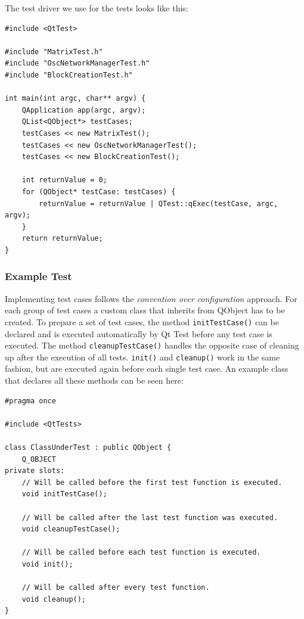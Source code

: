 \documentclass{scrreprt}
\begin{document}
The test driver we use for the tests looks like this:

\bigskip
\begin{lstlisting}[title=tests-qt/main.cpp]
#include <QtTest>

#include "MatrixTest.h"
#include "OscNetworkManagerTest.h"
#include "BlockCreationTest.h"

int main(int argc, char** argv) {
	QApplication app(argc, argv);	
	QList<QObject*> testCases;
	testCases << new MatrixTest();
	testCases << new OscNetworkManagerTest();
	testCases << new BlockCreationTest();
	
	int returnValue = 0;
	for (QObject* testCase: testCases) {
		returnValue = returnValue | QTest::qExec(testCase, argc, argv);
	}
	return returnValue;
}
\end{lstlisting}
\bigskip

\subsubsection{Example Test}

Implementing test cases follows the \textit{convention over configuration} approach. For each group of test cases a custom class that inherits from QObject has to be created. To prepare a set of test cases, the method \texttt{initTestCase()} can be declared and is executed automatically by Qt Test before any test case is executed. The method \texttt{cleanupTestCase()} handles the opposite case of cleaning up after the execution of all tests. \texttt{init()} and \texttt{cleanup()} work in the same fashion, but are executed again before each single test case. An example class that declares all these methods can be seen here:

\bigskip
\begin{lstlisting}[title=tests-qt/ClassUnderTest.h]
#pragma once

#include <QtTests>

class ClassUnderTest : public QObject {
	Q_OBJECT
private slots:
	// Will be called before the first test function is executed.
	void initTestCase();
	
	// Will be called after the last test function was executed.
	void cleanupTestCase();
	
	// Will be called before each test function is executed.
	void init();
	
	// Will be called after every test function.
	void cleanup();
}
\end{lstlisting}
\bigskip
\end{document}
